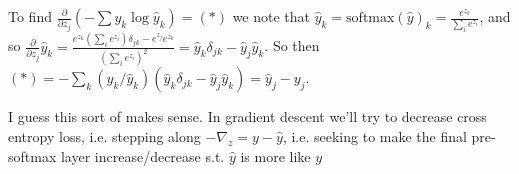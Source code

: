 %
%
\begin{answer}
To find $\frac{\partial}{\partial z_j} (- \sum y_k \log \hat{y}_k) = (*)$ we note that $\hat{y}_k = \text{softmax} (\hat{y})_k = \frac{e^{z_k}}{\sum_i e^{z_i}}$, and so $\frac{\partial}{\partial z_j} \hat{y}_k = \frac{e^{z_k} (\sum_i e^{z_i}) \delta_{jk} - e^{z_j} e^{z_k}}{(\sum_i e^{z_i})^2} = \hat{y}_k \delta_{jk} - \hat{y}_j \hat{y}_k$. So then $(*) = - \sum_k (y_k/\hat{y}_k)  (\hat{y}_k \delta_{jk} - \hat{y}_j \hat{y}_k) = \hat{y}_j - y_j $.

I guess this sort of makes sense. In gradient descent we'll try to decrease cross entropy loss, i.e. stepping along $-\nabla_z = y - \hat{y}$, i.e. seeking to make the final pre-softmax layer increase/decrease s.t. $\hat{y}$ is more like $y$
\end{answer}
%
  
